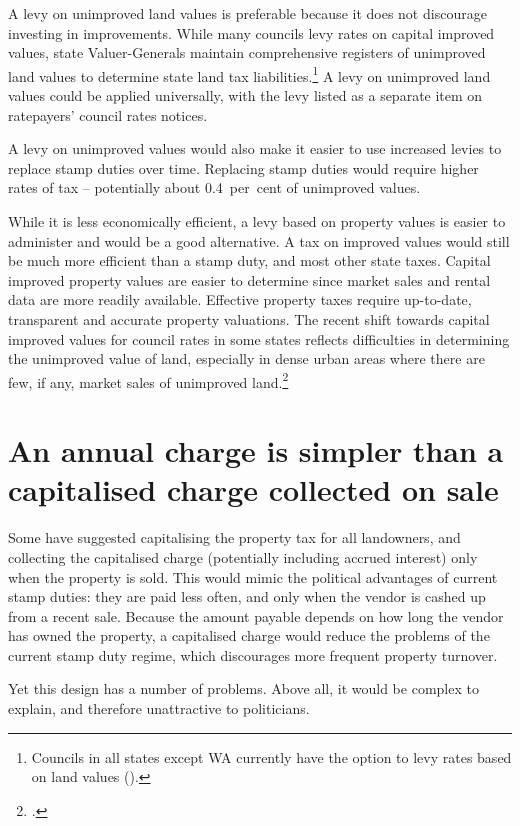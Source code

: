 \documentclass[twoside,english]{palatinob5portrait}
\begin{document}
A levy on unimproved land values is preferable because it does not discourage investing in improvements. While many councils levy rates on capital improved values, state Valuer-Generals maintain comprehensive registers of unimproved land values to determine state land tax liabilities.\footnote{Councils in all states except WA currently have the option to levy rates based on land values ().}  A levy on unimproved land values could be applied universally, with the levy listed as a separate item on ratepayers’ council rates notices.

A levy on unimproved values would also make it easier to use increased levies to replace stamp duties over time. Replacing stamp duties would require higher rates of tax – potentially about 0.4~per~cent of unimproved values. 

While it is less economically efficient, a levy based on property values is easier to administer and would be a good alternative. A tax on improved values would still be much more efficient than a stamp duty, and most other state taxes. Capital improved property values are easier to determine since market sales and rental data are more readily available. Effective property taxes require up-to-date, transparent and accurate property valuations. The recent shift towards capital improved values for council rates in some states reflects difficulties in determining the unimproved value of land, especially in dense urban areas where there are few, if any, market sales of unimproved land.\footcites[][24]{Ombudsman2005}[][153]{HefferanBoyd2010}

\section{\label{sec:PROP-6-4}An annual charge is simpler than a capitalised charge collected on sale}
Some have suggested capitalising the property tax for all landowners, and collecting the capitalised charge (potentially including accrued interest) only when the property is sold.  This would mimic the political advantages of current stamp duties: they are paid less often, and only when the vendor is cashed up from a recent sale. Because the amount payable depends on how long the vendor has owned the property, a capitalised charge would reduce the problems of the current stamp duty regime, which discourages more frequent property turnover.

Yet this design has a number of problems. Above all, it would be complex to explain, and therefore unattractive to politicians. 
\end{document}
